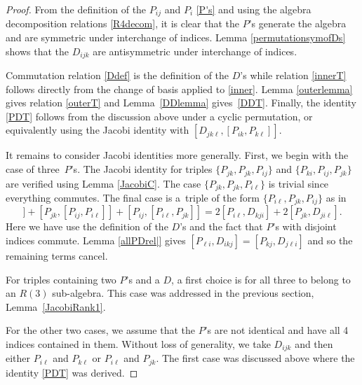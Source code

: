 \documentclass[10pt,a4paper]{amsart}
\numberwithin{equation}{section}
\begin{document}
\begin{proof}
 From the definition of the $P_{ij}$ and $P_{i}$ \eqref{P's} and using the algebra decomposition relations \eqref{R4decom}, it is clear that the $P$'s generate the algebra and are symmetric under interchange of indices. Lemma \ref{permutationsymofDs} shows that the $D_{ijk}$ are antisymmetric under interchange of indices.

Commutation relation \eqref{Ddef} is the definition of the $D$'s while relation \eqref{innerT} follows directly from the change of basis applied to \eqref{inner}. Lemma \ref{outerlemma} gives relation \eqref{outerT} and Lemma~\ref{DDlemma} gives~\eqref{DDT}. Finally, the identity \eqref{PDT} follows from the discussion above under a cyclic permutation, or equivalently using the Jacobi identity with $[D_{jk\ell}, [P_{ik}, P_{k\ell}]]$.

It remains to consider Jacobi identities more generally. First, we begin with the case of three~$P$'s. The Jacobi identity for triples $\{P_{jk},P_{jk},P_{ij}\} $ and $\{ P_{ki}, P_{ij}, P_{jk}\}$ are verified using Lemma \ref{JacobiC}. The case $\{P_{jk},P_{jk},P_{i\ell}\}$ is trivial since everything commutes. The final case is a~triple of the form $\{P_{i\ell},P_{jk},P_{ij}\}$ as in
\begin{equation*}
[ P_{i\ell},[P_{jk},P_{ij}]] + [P_{jk}, [ P_{ij}, P_{i\ell}]] + [P_{ij}, [P_{i\ell}, P_{jk}]]= 2[P_{i\ell}, D_{kji}]+2[P_{jk}, D_{ji\ell}].
\end{equation*}
Here we have use the definition of the $D$'s and the fact that $P$'s with disjoint indices commute. Lemma \ref{allPDrel|} gives
$ [P_{\ell i }, D_{i kj}]= [P_{kj}, D_{j \ell i}]$
and so the remaining terms cancel.

For triples containing two $P$'s and a $D$, a first choice is for all three to belong to an $R(3)$ sub-algebra. This case was addressed in the previous section, Lemma~\ref{JacobiRank1}.

For the other two cases, we assume that the $P$'s are not identical and have all 4 indices contained in them. Without loss of generality, we take $D_{ijk}$ and then either $P_{i\ell}$ and $P_{k \ell}$ or $P_{i \ell}$ and $P_{jk}$. The first case was discussed above where the identity \eqref{PDT} was derived.



\end{proof}
\end{document}
